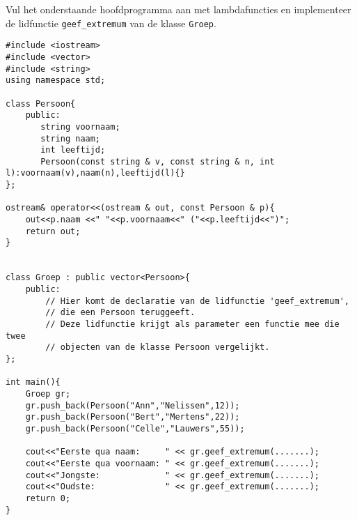 \beginoef
Vul het  onderstaande hoofdprogramma aan met lambdafuncties en implementeer de lidfunctie \verb}geef_extremum} van de klasse \verb}Groep}.

\begin{footnotesize}
\begin{verbatim}
#include <iostream>
#include <vector>
#include <string>
using namespace std;

class Persoon{
    public:
       string voornaam;
       string naam;
       int leeftijd;
       Persoon(const string & v, const string & n, int l):voornaam(v),naam(n),leeftijd(l){}
};	

ostream& operator<<(ostream & out, const Persoon & p){
    out<<p.naam <<" "<<p.voornaam<<" ("<<p.leeftijd<<")";
    return out;
}


class Groep : public vector<Persoon>{
    public:
        // Hier komt de declaratie van de lidfunctie 'geef_extremum',
        // die een Persoon teruggeeft.
        // Deze lidfunctie krijgt als parameter een functie mee die twee 
        // objecten van de klasse Persoon vergelijkt. 
};

int main(){
    Groep gr;
    gr.push_back(Persoon("Ann","Nelissen",12));
    gr.push_back(Persoon("Bert","Mertens",22));
    gr.push_back(Persoon("Celle","Lauwers",55));
	
    cout<<"Eerste qua naam:     " << gr.geef_extremum(.......);	
    cout<<"Eerste qua voornaam: " << gr.geef_extremum(.......);
    cout<<"Jongste:             " << gr.geef_extremum(.......);
    cout<<"Oudste:              " << gr.geef_extremum(.......);
    return 0;	
}
\end{verbatim}
\end{footnotesize}
\endoef
